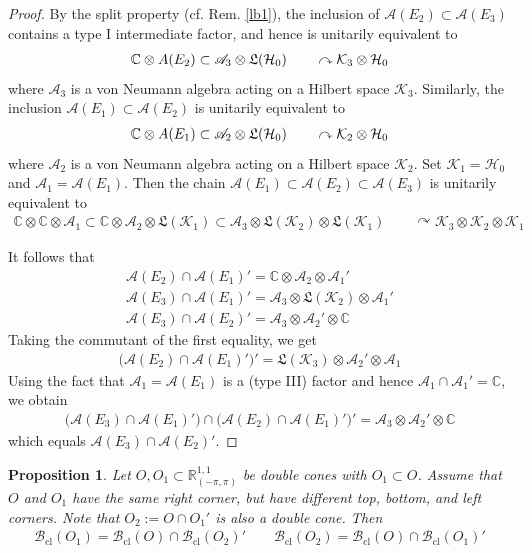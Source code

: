 \documentclass[11pt,b5paper,notitlepage]{article}
\theoremstyle{definition}
\theoremstyle{plain}
\newtheorem{pp}[df]{Proposition}
\newcommand{\fk}{\mathfrak}
\newcommand{\scr}{\mathscr}
\newcommand{\Cbb}{\mathbb C}
\newcommand{\MA}{\mathcal A}
\newcommand{\MH}{\mathcal H}
\newcommand{\MK}{\mathcal K}
\newcommand{\Rpp}{\mathbb R^{1,1}_{(-\pi,\pi)}}
\newcommand{\Bcl}{\mathcal B_{\mathrm{cl}}}
\newcommand{\SA}{\scr A}
\numberwithin{equation}{section}
\begin{document}
\begin{proof}
By the split property (cf. Rem. \ref{lb1}), the inclusion of $\MA(E_2)\subset\MA(E_3)$ contains a type I intermediate factor, and hence is unitarily equivalent to
\begin{align*}
\Cbb\otimes\scr \MA(E_2)\subset\scr A_3\otimes\fk L(\MH_0)\qquad\curvearrowright\MK_3\otimes\MH_0
\end{align*}
where $\scr A_3$ is a von Neumann algebra acting on a Hilbert space $\MK_3$. Similarly, the inclusion $\MA(E_1)\subset\MA(E_2)$ is unitarily equivalent to
\begin{align*}
\Cbb\otimes\scr \MA(E_1)\subset\scr A_2\otimes\fk L(\MH_0)\qquad\curvearrowright\MK_2\otimes\MH_0
\end{align*} 
where $\scr A_2$ is a von Neumann algebra acting on a Hilbert space $\MK_2$. Set $\MK_1=\MH_0$ and $\scr A_1=\MA(E_1)$. Then the chain $\MA(E_1)\subset\MA(E_2)\subset\MA(E_3)$ is unitarily equivalent to
\begin{align*}
\Cbb\otimes\Cbb\otimes\SA_1\subset\Cbb\otimes\SA_2\otimes\fk L(\MK_1)\subset\SA_3\otimes\fk L(\MK_2)\otimes\fk L(\MK_1) \qquad\curvearrowright\MK_3\otimes\MK_2\otimes\MK_1
\end{align*}

It follows that
\begin{gather*}
\MA(E_2)\cap\MA(E_1)'=\Cbb\otimes\SA_2\otimes\SA_1'\\
\MA(E_3)\cap\MA(E_1)'=\SA_3\otimes\fk L(\MK_2)\otimes\SA_1'\\
\MA(E_3)\cap\MA(E_2)'=\SA_3\otimes\SA_2'\otimes\Cbb
\end{gather*}
Taking the commutant of the first equality, we get
\begin{align*}
\big(\MA(E_2)\cap\MA(E_1)'\big)'=\fk L(\MK_3)\otimes\SA_2'\otimes\SA_1
\end{align*}
Using the fact that $\SA_1=\MA(E_1)$ is a (type III) factor and hence $\SA_1\cap\SA_1'=\Cbb$, we obtain
\begin{align*}
\big(\MA(E_3)\cap\MA(E_1)'\big)\cap\big(\MA(E_2)\cap\MA(E_1)'\big)'=\SA_3\otimes\SA_2'\otimes \Cbb
\end{align*} 
which equals $\MA(E_3)\cap\MA(E_2)'$.
\end{proof}


\begin{pp}\label{lb93}
Let $O,O_1\subset\Rpp$ be double cones with $O_1\subset O$. Assume that $O$ and $O_1$ have the same right corner,
but have different top, bottom, and left corners. Note that $O_2:=O\cap O_1'$ is also a double cone. Then
\begin{align*}
\Bcl(O_1)=\Bcl(O)\cap\Bcl(O_2)'\qquad \Bcl(O_2)=\Bcl(O)\cap\Bcl(O_1)'
\end{align*} 
\end{pp}
\end{document}
